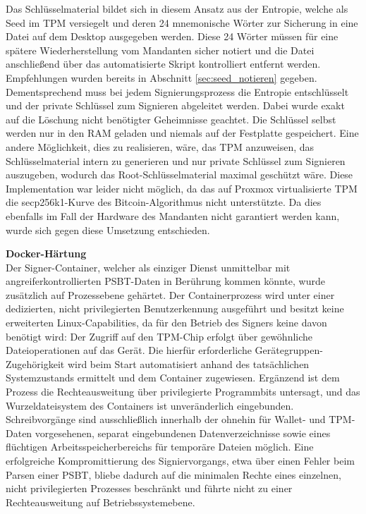 Das Schlüsselmaterial bildet sich in diesem Ansatz aus der Entropie, welche als Seed im \ac{TPM} versiegelt und deren 24 mnemonische Wörter zur Sicherung in eine Datei auf dem Desktop ausgegeben werden. Diese 24 Wörter müssen für eine spätere Wiederherstellung vom Mandanten sicher notiert und die Datei anschließend über das automatisierte Skript  kontrolliert entfernt werden. Empfehlungen wurden bereits in Abschnitt \ref{sec:seed_notieren} gegeben. Dementsprechend muss bei jedem Signierungsprozess die Entropie entschlüsselt und der private Schlüssel zum Signieren abgeleitet werden. Dabei wurde exakt auf die Löschung nicht benötigter Geheimnisse geachtet. Die Schlüssel selbst werden nur in den \ac{RAM} geladen und niemals auf der Festplatte gespeichert.
Eine andere Möglichkeit, dies zu realisieren, wäre, das \ac{TPM} anzuweisen, das Schlüsselmaterial intern zu generieren und nur private Schlüssel zum Signieren auszugeben, wodurch das Root-Schlüsselmaterial maximal geschützt wäre. Diese Implementation war leider nicht möglich, da das auf Proxmox virtualisierte \ac{TPM} die secp256k1-Kurve des Bitcoin-Algorithmus nicht unterstützte. Da dies ebenfalls im Fall der Hardware des Mandanten nicht garantiert werden kann, wurde sich gegen diese Umsetzung entschieden.

\textbf{Docker-Härtung} \\
Der Signer-Container, welcher als einziger Dienst unmittelbar mit angreiferkontrollierten \ac{PSBT}-Daten in Berührung kommen könnte, wurde zusätzlich auf Prozessebene gehärtet. Der Containerprozess wird unter einer dedizierten, nicht privilegierten Benutzerkennung ausgeführt und besitzt keine erweiterten Linux-Capabilities, da für den Betrieb des Signers keine davon benötigt wird: Der Zugriff auf den \ac{TPM}-Chip erfolgt über gewöhnliche Dateioperationen auf das Gerät. Die hierfür erforderliche Gerätegruppen-Zugehörigkeit wird beim Start automatisiert anhand des tatsächlichen Systemzustands ermittelt und dem Container zugewiesen. Ergänzend ist dem Prozess die Rechteausweitung über privilegierte Programmbits untersagt, und das Wurzeldateisystem des Containers ist unveränderlich eingebunden. Schreibvorgänge sind ausschließlich innerhalb der ohnehin für Wallet- und \ac{TPM}-Daten vorgesehenen, separat eingebundenen Datenverzeichnisse sowie eines flüchtigen Arbeitsspeicherbereichs für temporäre Dateien möglich. Eine erfolgreiche Kompromittierung des Signiervorgangs, etwa über einen Fehler beim Parsen einer \ac{PSBT}, bliebe dadurch auf die minimalen Rechte eines einzelnen, nicht privilegierten Prozesses beschränkt und führte nicht zu einer Rechteausweitung auf Betriebssystemebene.

